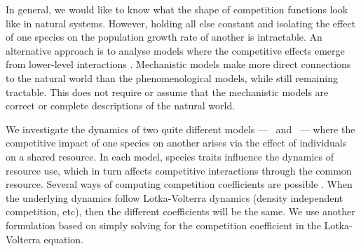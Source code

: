 \documentclass[a4paper,11pt]{article}
\begin{document}
In general, we would like to know what the shape of competition
functions look like in natural systems.  However, holding all else
constant and isolating the effect of one species on the population
growth rate of another is intractable.
%
An alternative approach is to analyse models where the competitive
effects emerge from lower-level interactions
\citep[e.g.,][]{Draghi-2012}.  Mechanistic models make more direct
connections to the natural world than the phenomenological models,
while still remaining tractable.  This does not require or assume that
the mechanistic models are correct or complete descriptions of the
natural world.



We investigate the dynamics of two quite different models --- \plant\
and \Rstar\ --- where the competitive impact of one species on another
arises via the effect of individuals on a shared resource.
%
In each model, species traits influence the dynamics of resource use,
which in turn affects competitive interactions through the common
resource.  Several ways of computing competition coefficients are
possible \citep[e.g.,][]{Abrams-1987,Abrams-2008}.  When the
underlying dynamics follow Lotka-Volterra dynamics (density
independent competition, etc), then the different coefficients will be
the same.  We use another formulation based on simply solving for the
competition coefficient in the Lotka-Volterra equation.
\end{document}
